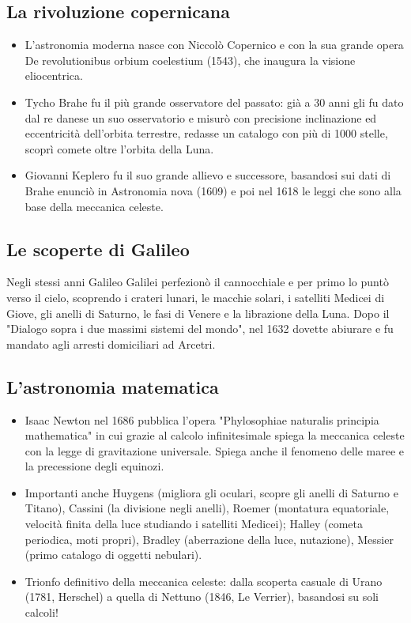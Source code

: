\documentclass[a4paper, oneside]{book}
\begin{document}
\subsection{La rivoluzione copernicana}
\begin{itemize}
     \item  L’astronomia moderna nasce con Niccolò
Copernico e con la sua grande opera De
revolutionibus orbium coelestium (1543),
che inaugura la visione eliocentrica.
 \item Tycho Brahe fu il più grande osservatore
del passato: già a 30 anni gli fu dato dal
re danese un suo osservatorio e misurò
con precisione inclinazione ed eccentricità
dell’orbita terrestre, redasse un catalogo
con più di 1000 stelle, scoprì comete oltre
l’orbita della Luna.
\item  Giovanni Keplero fu il suo grande allievo e
successore, basandosi sui dati di Brahe
enunciò in Astronomia nova (1609) e poi
nel 1618 le leggi che sono alla base della
meccanica celeste.
\end{itemize}
\subsection{Le scoperte di Galileo}
Negli stessi anni Galileo Galilei perfezionò il cannocchiale e per
primo lo puntò verso il cielo, scoprendo i crateri lunari, le
macchie solari, i satelliti Medicei di Giove, gli anelli di Saturno,
le fasi di Venere e la librazione della Luna. Dopo il "Dialogo
sopra i due massimi sistemi del mondo", nel 1632 dovette
abiurare e fu mandato agli arresti domiciliari ad Arcetri.

\subsection{L’astronomia matematica}
\begin{itemize}
    \item Isaac Newton nel 1686 pubblica l’opera
"Phylosophiae naturalis principia mathematica"
in cui grazie al calcolo infinitesimale spiega la
meccanica celeste con la legge di gravitazione
universale. Spiega anche il fenomeno delle
maree e la precessione degli equinozi.
\item  Importanti anche Huygens (migliora gli
oculari, scopre gli anelli di Saturno e Titano),
Cassini (la divisione negli anelli), Roemer
(montatura equatoriale, velocità finita della
luce studiando i satelliti Medicei); Halley
(cometa periodica, moti propri), Bradley
(aberrazione della luce, nutazione), Messier
(primo catalogo di oggetti nebulari).
\item Trionfo definitivo della meccanica celeste:
dalla scoperta casuale di Urano (1781,
Herschel) a quella di Nettuno (1846, Le
Verrier), basandosi su soli calcoli!
\end{itemize}
\end{document}
